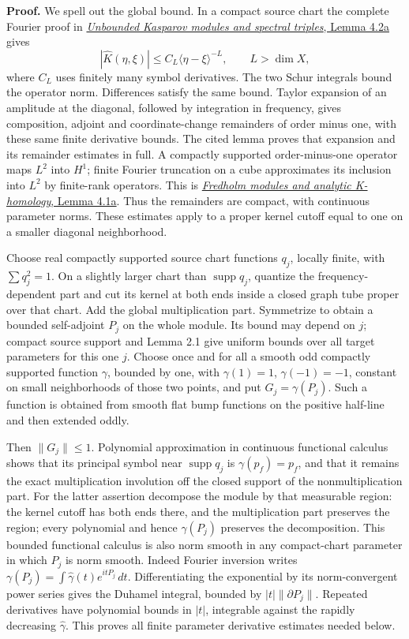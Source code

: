 \documentclass[
  11pt,
]{article}
\begin{document}
\textbf{Proof.} We spell out the global bound. In a compact source chart
the complete Fourier proof in
\href{KT-KK-11.html\#4-spectral-triples-and-the-circle}{\emph{Unbounded
Kasparov modules and spectral triples}, Lemma 4.2a} gives \[
 |\widehat K(\eta,\xi)|\leq C_L\langle\eta-\xi\rangle^{-L},\qquad L>\dim X,
 \tag{3.4}
\] where \(C_L\) uses finitely many symbol derivatives. The two Schur
integrals bound the operator norm. Differences satisfy the same bound.
Taylor expansion of an amplitude at the diagonal, followed by
integration in frequency, gives composition, adjoint and
coordinate-change remainders of order minus one, with these same finite
derivative bounds. The cited lemma proves that expansion and its
remainder estimates in full. A compactly supported order-minus-one
operator maps \(L^2\) into \(H^1\); finite Fourier truncation on a cube
approximates its inclusion into \(L^2\) by finite-rank operators. This
is
\href{KT-KK-03.html\#lemma-4-1a-finite-chart-sobolev-density-and-compactness}{\emph{Fredholm
modules and analytic K-homology}, Lemma 4.1a}. Thus the remainders are
compact, with continuous parameter norms. These estimates apply to a
proper kernel cutoff equal to one on a smaller diagonal neighborhood.

Choose real compactly supported source chart functions \(q_j\), locally
finite, with \(\sum q_j^2=1\). On a slightly larger chart than
\(\operatorname{supp}q_j\), quantize the frequency-dependent part and
cut its kernel at both ends inside a closed graph tube proper over that
chart. Add the global multiplication part. Symmetrize to obtain a
bounded self-adjoint \(P_j\) on the whole module. Its bound may depend
on \(j\); compact source support and Lemma 2.1 give uniform bounds over
all target parameters for this one \(j\). Choose once and for all a
smooth odd compactly supported function \(\gamma\), bounded by one, with
\(\gamma(1)=1\), \(\gamma(-1)=-1\), constant on small neighborhoods of
those two points, and put \(G_j=\gamma(P_j)\). Such a function is
obtained from smooth flat bump functions on the positive half-line and
then extended oddly.

Then \(\|G_j\|\leq1\). Polynomial approximation in continuous functional
calculus shows that its principal symbol near \(\operatorname{supp}q_j\)
is \(\gamma(p_f)=p_f\), and that it remains the exact multiplication
involution off the closed support of the nonmultiplication part. For the
latter assertion decompose the module by that measurable region: the
kernel cutoff has both ends there, and the multiplication part preserves
the region; every polynomial and hence \(\gamma(P_j)\) preserves the
decomposition. This bounded functional calculus is also norm smooth in
any compact-chart parameter in which \(P_j\) is norm smooth. Indeed
Fourier inversion writes
\(\gamma(P_j)=\int\widehat\gamma(t)e^{itP_j}\,dt\). Differentiating the
exponential by its norm-convergent power series gives the Duhamel
integral, bounded by \(|t|\|\partial P_j\|\). Repeated derivatives have
polynomial bounds in \(|t|\), integrable against the rapidly decreasing
\(\widehat\gamma\). This proves all finite parameter derivative
estimates needed below.
\end{document}
